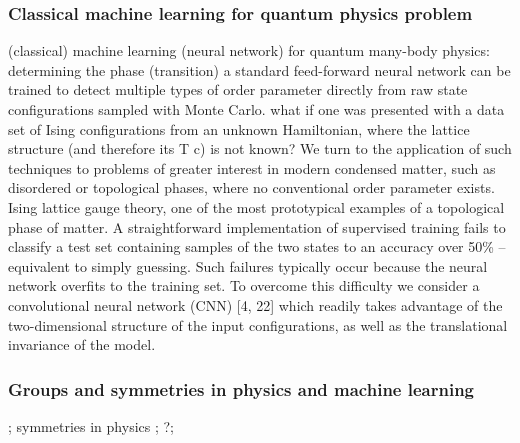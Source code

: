 \subsubsection{Classical machine learning for quantum physics problem}
(classical) machine learning (neural network) for quantum many-body physics:
determining the phase (transition) 
a standard feed-forward neural network can be trained to detect multiple types of order parameter directly from raw state conﬁgurations sampled with Monte Carlo.
what if one was presented with a data set of Ising conﬁgurations from an unknown Hamiltonian, where the lattice structure (and therefore its T c) is not known?
We turn to the application of such techniques to problems of greater interest in modern condensed matter, such as disordered or topological phases, where no conventional order parameter exists.
Ising lattice gauge theory, one of the most prototypical examples of a topological phase of matter.
A straightforward implementation of supervised training fails to classify a test set containing samples of the two states to an accuracy over 50\% – equivalent to simply guessing. Such failures typically occur because the neural network overﬁts to the training set. To overcome this diﬃculty we consider a convolutional neural network (CNN) [4, 22] which readily takes advantage of the two-dimensional structure of the input conﬁgurations, as well as the translational invariance of the model.
\cite{carrasquillaMachineLearningPhases2017}
\cite{carleoSolvingQuantumManyBody2017}


\subsubsection{Groups and symmetries in physics and machine learning}
\cite{kondorGroupTheoreticalMethods2008};
symmetries in physics
\cite{bogatskiyLorentzGroupEquivariant2020}
\cite{bogatskiySymmetryGroupEquivariant2022};
\cite{zhengSpeedingLearningQuantum2022}?;

